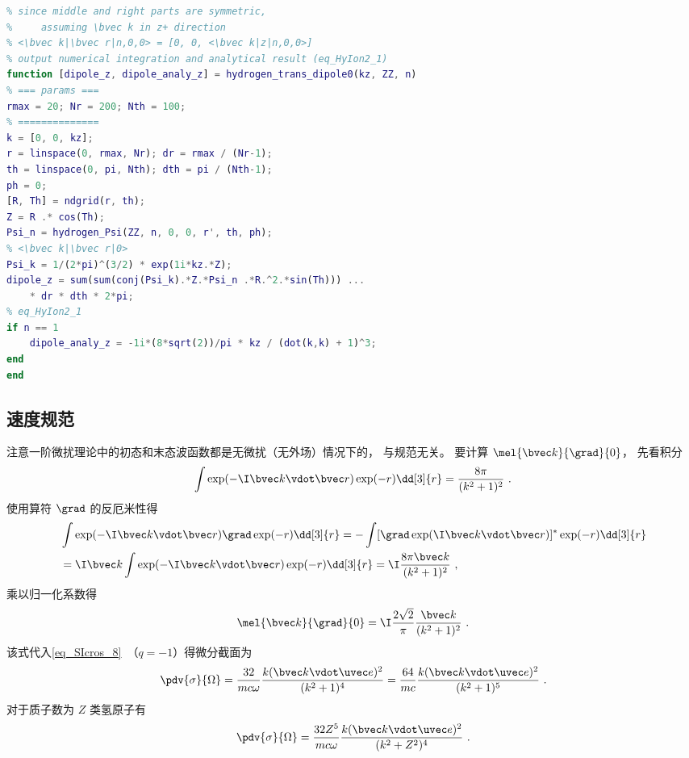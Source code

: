 \begin{lstlisting}[language=matlab, caption=hydrogen\_trans\_dipole0.m]
% hydrogen transition dipole, approximate Coulomb plane wave with plane wave
% since middle and right parts are symmetric,
%     assuming \bvec k in z+ direction
% <\bvec k|\bvec r|n,0,0> = [0, 0, <\bvec k|z|n,0,0>]
% output numerical integration and analytical result (eq_HyIon2_1)
function [dipole_z, dipole_analy_z] = hydrogen_trans_dipole0(kz, ZZ, n)
% === params ===
rmax = 20; Nr = 200; Nth = 100;
% ==============
k = [0, 0, kz];
r = linspace(0, rmax, Nr); dr = rmax / (Nr-1);
th = linspace(0, pi, Nth); dth = pi / (Nth-1);
ph = 0;
[R, Th] = ndgrid(r, th);
Z = R .* cos(Th);
Psi_n = hydrogen_Psi(ZZ, n, 0, 0, r', th, ph);
% <\bvec k|\bvec r|0>
Psi_k = 1/(2*pi)^(3/2) * exp(1i*kz.*Z);
dipole_z = sum(sum(conj(Psi_k).*Z.*Psi_n .*R.^2.*sin(Th))) ...
    * dr * dth * 2*pi;
% eq_HyIon2_1
if n == 1
    dipole_analy_z = -1i*(8*sqrt(2))/pi * kz / (dot(k,k) + 1)^3;
end
end
\end{lstlisting}


\subsection{速度规范}
注意一阶微扰理论中的初态和末态波函数都是无微扰（无外场）情况下的， 与规范无关。 要计算 $\mel{\bvec k}{\grad}{0}$， 先看积分
\begin{equation}
\int \exp(-\I \bvec k \vdot \bvec r) \exp(-r) \dd[3]{r} = \frac{8\pi }{(k^2 + 1)^2}~.
\end{equation}
使用算符 $\grad$ 的反厄米性得
\begin{equation}
\begin{aligned}
&\int \exp(-\I \bvec k \vdot \bvec r) \grad \exp(-r) \dd[3]{r}
= -\int [\grad \exp(\I \bvec k \vdot \bvec r)]^* \exp(-r) \dd[3]{r}\\
&= \I \bvec k \int \exp(-\I \bvec k \vdot \bvec r) \exp(-r) \dd[3]{r}
= \I \frac{8 \pi  \bvec k}{(k^2 + 1)^2}~,
\end{aligned}
\end{equation}
乘以归一化系数得
\begin{equation}\label{eq_HyIon2_2}
\mel{\bvec k}{\grad}{0} = \I\frac{2\sqrt{2}}{\pi}\frac{\bvec k}{(k^2 + 1)^2}~.
\end{equation}
该式代入\autoref{eq_SIcros_8}~（$q = -1$）得微分截面为
\begin{equation}
\pdv{\sigma}{\Omega} = \frac{32}{mc\omega} \frac{k(\bvec k \vdot \uvec e)^2}{(k^2 + 1)^4}
= \frac{64}{mc} \frac{k(\bvec k \vdot \uvec e)^2}{(k^2 + 1)^5}~.
\end{equation}
对于质子数为 $Z$ 类氢原子有
\begin{equation}
\pdv{\sigma}{\Omega} = \frac{32 Z^5}{mc\omega} \frac{k(\bvec k \vdot \uvec e)^2}{(k^2 + Z^2)^4}~.
\end{equation}

